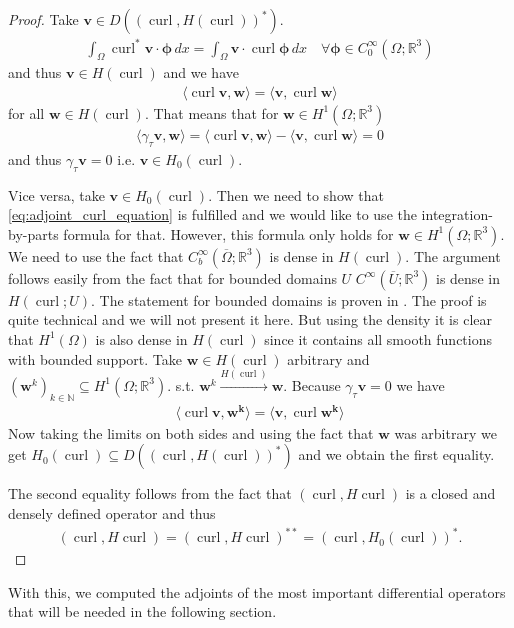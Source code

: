 \documentclass[12pt,a4paper]{article}
\numberwithin{equation}{subsection}
\numberwithin{lemma}{subsection}
\theoremstyle{definition}
\DeclareMathOperator{\curl}{curl}
\newcommand{\naturalnum}{\mathbb{N}}
\newcommand{\real}{\mathbb{R}}
\begin{document}
\begin{proof}
    Take $\mathbf{v} \in D((\curl, H(\curl))^*)$. 
    \begin{align*}
        \int_\Omega \curl^*\mathbf{v} \cdot \boldsymbol{\phi} \, dx
        = \int_\Omega \mathbf{v} \cdot \curl \boldsymbol{\phi} \, dx
            \quad \forall \boldsymbol{\phi} \in C_0^\infty(\Omega;\real^3)
    \end{align*}
    and thus $\mathbf{v} \in H(\curl)$ and we have 
    \begin{align}
        \langle \curl \mathbf{v}, \mathbf{w} \rangle
        = \langle \mathbf{v}, \curl \mathbf{w} \rangle \label{eq:adjoint_curl_equation}
    \end{align}
    for all $\mathbf{w} \in H(\curl)$. That means that for $\mathbf{w} \in H^1(\Omega;\real^3)$
    \begin{align*}
        \langle \gamma_\tau \mathbf{v}, \mathbf{w} \rangle 
        =  \langle \curl \mathbf{v}, \mathbf{w} \rangle - \langle \mathbf{v}, \curl \mathbf{w} \rangle
        = 0
    \end{align*}
    and thus $\gamma_\tau \mathbf{v} = 0$ i.e. $\mathbf{v} \in H_0(\curl)$.

    Vice versa, take $\mathbf{v} \in H_0(\curl)$. Then we need to show that 
    \ref{eq:adjoint_curl_equation} is fulfilled and we would like to use the integration-by-parts formula 
    for that. However, this formula only holds for $\mathbf{w} \in H^1(\Omega;\real^3)$. 
    We need to use the fact that $C_b^\infty(\overline{\Omega};\real^3)$ is 
    dense in $H(\curl)$. The argument follows easily from the fact that 
    for bounded domains $U$ $C^\infty(\overline{U};\real^3)$ is dense in $H(\curl;U)$. 
    The statement for bounded domains is proven in \cite[Lemma 3.27]{monk}. 
    The proof is quite technical 
    and we will not present it here. But using the density it is clear that 
    $H^1(\Omega)$ is also dense in $H(\curl)$ since it contains all smooth functions 
    with bounded support. Take $\mathbf{w} \in H(\curl)$ arbitrary and 
    $(\mathbf{w}^k)_{k \in \naturalnum} \subseteq H^1(\Omega;\real^3)$.
    s.t. $\mathbf{w}^k \xrightarrow{H(\curl)} \mathbf{w}$.
    Because $\gamma_\tau \mathbf{v} = 0$ we have 
    \begin{align*}
        \langle \curl \mathbf{v}, \mathbf{w^k} \rangle
        = \langle \mathbf{v}, \curl \mathbf{w^k} \rangle
    \end{align*}
    Now taking the limits on both sides and using the fact that $\mathbf{w}$ was 
    arbitrary we get $H_0(\curl) \subseteq D((\curl, H(\curl))^*)$ and 
    we obtain the first equality. 

    The second equality follows from the fact that $(\curl, H\curl)$ is 
    a closed and densely defined operator and thus 
    \begin{align*}
        (\curl, H\curl)= (\curl, H\curl)^{**} = (\curl, H_0(\curl))^*.
    \end{align*}
\end{proof}
With this, we computed the adjoints of the most important differential operators that 
will be needed in the following section. 
\end{document}
